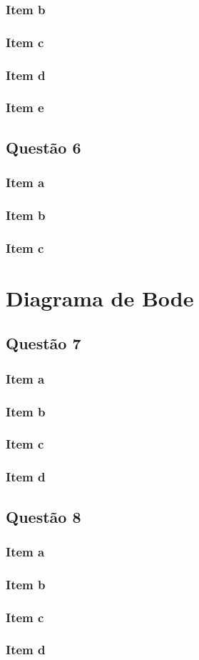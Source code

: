 \documentclass[a4paper, 12pt]{article}
\begin{document}
        \subsubsection{Item b}
        \subsubsection{Item c}
        \subsubsection{Item d}
        \subsubsection{Item e}
    \subsection{Quest\~{a}o 6}
        \subsubsection{Item a}
        \subsubsection{Item b}
        \subsubsection{Item c}
\section{Diagrama de Bode}
    \subsection{Quest\~{a}o 7}
        \subsubsection{Item a}
        \subsubsection{Item b}
        \subsubsection{Item c}
        \subsubsection{Item d}
    \subsection{Quest\~{a}o 8}
        \subsubsection{Item a}
        \subsubsection{Item b}
        \subsubsection{Item c}
        \subsubsection{Item d}
\end{document}
